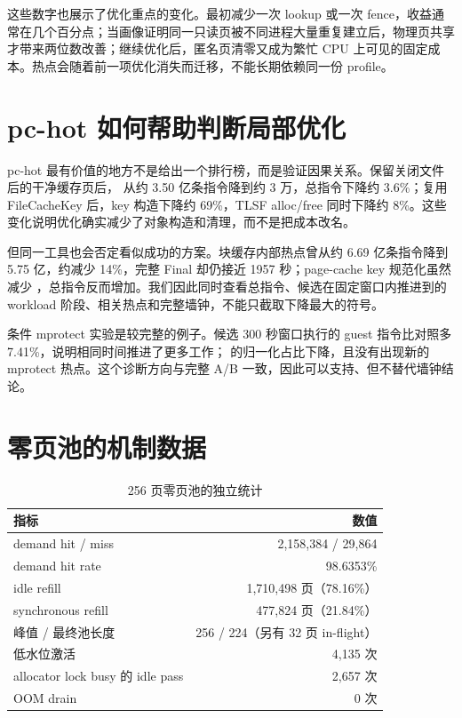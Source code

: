这些数字也展示了优化重点的变化。最初减少一次 lookup 或一次 fence，收益通常在几个百分点；当画像证明同一只读页被不同进程大量重复建立后，物理页共享才带来两位数改善；继续优化后，匿名页清零又成为繁忙 CPU 上可见的固定成本。热点会随着前一项优化消失而迁移，不能长期依赖同一份 profile。

\section{pc-hot 如何帮助判断局部优化}

pc-hot 最有价值的地方不是给出一个排行榜，而是验证因果关系。保留关闭文件后的干净缓存页后， 从约 3.50 亿条指令降到约 3 万，总指令下降约 3.6\%；复用 FileCacheKey 后，key 构造下降约 69\%，TLSF alloc/free 同时下降约 8\%。这些变化说明优化确实减少了对象构造和清理，而不是把成本改名。

但同一工具也会否定看似成功的方案。块缓存内部热点曾从约 6.69 亿条指令降到 5.75 亿，约减少 14\%，完整 Final 却仍接近 1957 秒；page-cache key 规范化虽然减少 ，总指令反而增加。我们因此同时查看总指令、候选在固定窗口内推进到的 workload 阶段、相关热点和完整墙钟，不能只截取下降最大的符号。

条件 mprotect 实验是较完整的例子。候选 300 秒窗口执行的 guest 指令比对照多 7.41\%，说明相同时间推进了更多工作； 的归一化占比下降，且没有出现新的 mprotect 热点。这个诊断方向与完整 A/B 一致，因此可以支持、但不替代墙钟结论。

\section{零页池的机制数据}

\begin{table}[htbp]
  \centering
  \caption{256 页零页池的独立统计}
  \begin{tabular}{lr}
    \toprule
    指标 & 数值 \\
    \midrule
    demand hit / miss & 2,158,384 / 29,864 \\
    demand hit rate & 98.6353\% \\
    idle refill & 1,710,498 页（78.16\%） \\
    synchronous refill & 477,824 页（21.84\%） \\
    峰值 / 最终池长度 & 256 / 224（另有 32 页 in-flight） \\
    低水位激活 & 4,135 次 \\
    allocator lock busy 的 idle pass & 2,657 次 \\
    OOM drain & 0 次 \\
    \bottomrule
  \end{tabular}
\end{table}


